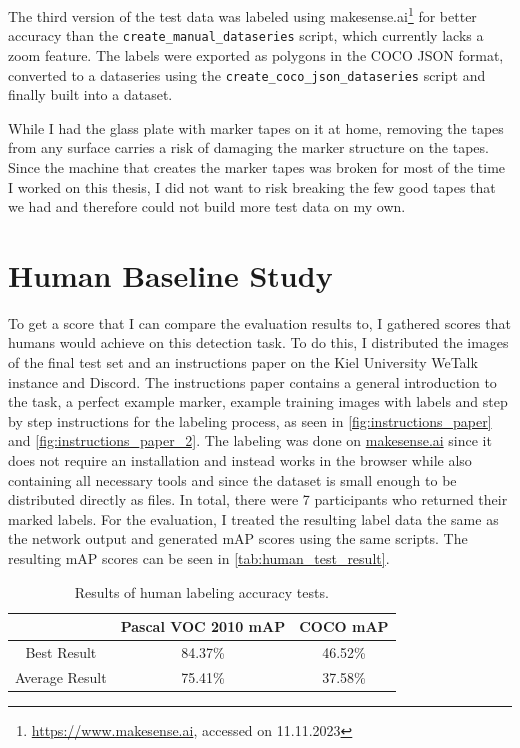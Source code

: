 \documentclass[10pt]{book}
\newcommand{\figureref}[1]{\autoref{#1}}
\begin{document}
The third version of the test data was labeled using makesense.ai\footnote{\url{https://www.makesense.ai}, accessed on 11.11.2023} for better accuracy than the \texttt{create\_manual\_dataseries} script, which currently lacks a zoom feature. The labels were exported as polygons in the \ac{COCO} \ac{JSON} format, converted to a dataseries using the \texttt{create\_coco\_json\_dataseries} script and finally built into a dataset.

While I had the glass plate with marker tapes on it at home, removing the tapes from any surface carries a risk of damaging the marker structure on the tapes. Since the machine that creates the marker tapes was broken for most of the time I worked on this thesis, I did not want to risk breaking the few good tapes that we had and therefore could not build more test data on my own.

\section{Human Baseline Study}

To get a score that I can compare the evaluation results to, I gathered scores that humans would achieve on this detection task. To do this, I distributed the images of the final test set and an instructions paper on the Kiel University WeTalk instance and Discord. The instructions paper contains a general introduction to the task, a perfect example marker, example training images with labels and step by step instructions for the labeling process, as seen in \figureref{fig:instructions_paper} and \figureref{fig:instructions_paper_2}. The labeling was done on \href{https://www.makesense.ai}{makesense.ai} since it does not require an installation and instead works in the browser while also containing all necessary tools and since the dataset is small enough to be distributed directly as files. In total, there were 7 participants who returned their marked labels. For the evaluation, I treated the resulting label data the same as the network output and generated \ac{mAP} scores using the same scripts. The resulting \ac{mAP} scores can be seen in \autoref{tab:human_test_result}.

\begin{table}
  \begin{tabular}{ c c c }
   & Pascal VOC 2010 \ac{mAP} & \ac{COCO} \ac{mAP} \\ 
   \hline
   Best Result & 84.37\% & 46.52\% \\
   Average Result & 75.41\% & 37.58\% \\
   \hline
  \end{tabular}
  \caption{\label{tab:human_test_result}Results of human labeling accuracy tests.}
\end{table}
\end{document}
